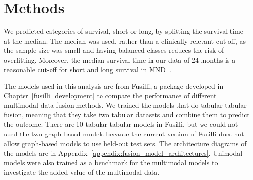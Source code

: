 \section{Methods}

We predicted categories of survival, short or long, by splitting the survival time at the median.
The median was used, rather than a clinically relevant cut-off, as the sample size was small and having balanced classes reduces the risk of overfitting.
Moreover, the median survival time in our data of 24 months is a reasonable cut-off for short and long survival in MND~\cite{feldmanAmyotrophicLateralSclerosis2022}.


The models used in this analysis are from Fusilli, a package developed in Chapter~\ref{fusilli_development} to compare the performance of different multimodal data fusion methods.
We trained the models that do tabular-tabular fusion, meaning that they take two tabular datasets and combine them to predict the outcome.
There are 10 tabular-tabular models in Fusilli, but we could not used the two graph-based models because the current version of Fusilli does not allow graph-based models to use held-out test sets.
The architecture diagrams of the models are in Appendix~\ref{appendix:fusion_model_architectures}.
Unimodal models were also trained as a benchmark for the multimodal models to investigate the added value of the multimodal data.

